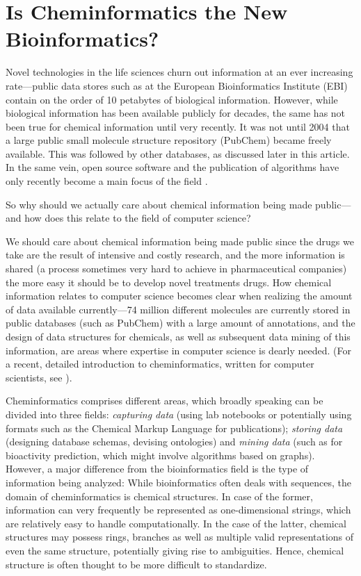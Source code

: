 \documentclass{sig-alternate}
\begin{document}
\section{Is Cheminformatics the New Bioinformatics?}

Novel technologies in the life sciences churn out information at an ever
increasing rate---public data stores such as at the European Bioinformatics
Institute (EBI) contain on the order of 10 petabytes of biological information.
However, while biological information has been available publicly for decades,
the same has not been true for chemical information until very recently. It was
not until 2004 that a large public small molecule structure repository (PubChem)
became freely available. This was followed by other databases, as discussed later
in this article. In the same vein, open source software and the publication of
algorithms have only recently become a main focus of the field
\cite{faulon2010}.

So why should we actually care about chemical information being made
public---and how does this relate to the field of computer science?

We should care about chemical information being made public since the
drugs we take are the result of intensive and costly research, and the
more information is shared (a process sometimes very hard to achieve
in pharmaceutical companies) the more easy it should be to develop
novel treatments drugs. How chemical information relates to computer
science becomes clear when realizing the amount of data available
currently---74 million different molecules are currently stored in
public databases (such as PubChem) with a large amount of annotations,
and the design of data structures for chemicals, as well as subsequent
data mining of this information, are areas where expertise in computer
science is dearly needed. (For a recent, detailed introduction to
cheminformatics, written for computer scientists, see
\cite{brown2009}).

Cheminformatics comprises different areas, which broadly speaking can be divided
into three fields: \emph{capturing data} (using lab notebooks or potentially using
formats such as the Chemical Markup Language for publications); \emph{storing data}
(designing database schemas, devising ontologies) and \emph{mining data} (such as for
bioactivity prediction, which might involve algorithms based on graphs).
However, a major difference from the bioinformatics field is the type of
information being analyzed: While bioinformatics often deals with sequences, the
domain of cheminformatics is chemical structures. In case of the former,
information can very frequently be represented as one-dimensional strings, which
are relatively easy to handle computationally. In the case of the latter, chemical
structures may possess rings, branches as well as multiple valid representations
of even the same structure, potentially giving rise to ambiguities. Hence,
chemical structure is often thought to be more difficult to standardize. 
\end{document}

